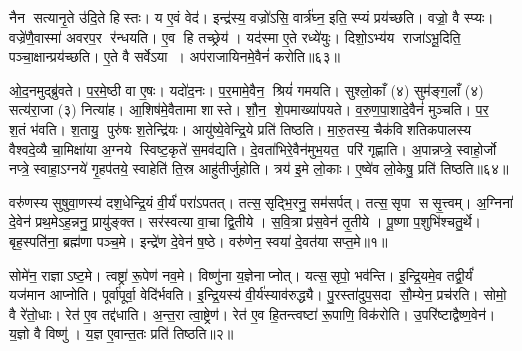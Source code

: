 नैन सत्यानृ॒ते उ॑दि॒ते हिस्तः।
य ए॒वं वेद॑।
इन्द्र॑स्य॒ वज्रो॑ऽसि॒ वार्त्र॑घ्न॒ इति॒ स्प्यं प्रय॑च्छति।
वज्रो॒ वै स्प्यः।
वज्रे॑णै॒वास्मा॑ अवरप॒र र॑न्धयति।
ए॒व हि तच्छ्रेय॑।
यद॑स्मा ए॒ते रध्ये॑युः।
दिशो॒ऽभ्य॑य राजा॑ऽभू॒दिति॒ पञ्चा॒क्षान्प्रय॑च्छति।
ए॒ते वै सर्वेऽया।
अप॑राजायिनमे॒वैनं॑ करोति॥६३॥

ओ॒द॒नमुद्ब्रु॑वते।
प॒र॒मे॒ष्ठी वा ए॒षः।
यदो॑द॒नः।
प॒र॒मामे॒वैन॒ श्रियं॑ गमयति।
सुश्लो॒काँ (४) सुम॑ङ्ग॒लाँ (४) सत्य॑रा॒जा (३) नित्या॑ह।
आ॒शिष॑मे॒वैतामा शास्ते।
शौ॒न॒ शे॒पमाख्या॑पयते।
व॒रु॒ण॒पा॒शादे॒वैनं॑ मुञ्चति।
प॒र॒ श॒तं भ॑वति।
श॒तायु॒ पुरु॑षः श॒तेन्द्रि॑यः।
आयु॑ष्ये॒वेन्द्रि॒ये प्रति॑ तिष्ठति।
मा॒रु॒तस्य॒ चैक॑विशतिकपालस्य वैश्वदे॒व्यै चा॒मिक्षा॑या अ॒ग्नये स्विष्ट॒कृते॑ स॒मव॑द्यति।
दे॒वता॑भिरे॒वैन॑मुभ॒यत॒ परि॑ गृह्णाति।
अ॒पान्नप्त्रे॒ स्वाहो॒र्जो नप्त्रे॒ स्वाहा॒ऽग्नये॑ गृ॒हप॑तये॒ स्वाहेति॑ ति॒स्र आहु॑तीर्जुहोति।
त्रय॑ इ॒मे लो॒काः।
ए॒ष्वे॑व लो॒केषु॒ प्रति॑ तिष्ठति॥६४॥\anuvakamend[दे॒वैरित्या॑ह स॒त्यस॑वं करोति त्रि॒ष्टुभ॑मे॒वैतेना॑भि॒ व्याह॑रति सत्यानृ॒ते ए॒वाव॑रुन्धे करोति श॒तेन्द्रि॑य॒ष्षट् च॑]




\clearpage
{}
\setcounter{anuvakam}{0}

वरु॑णस्य सुषुवा॒णस्य॑ दश॒धेन्द्रि॒यं वी॒र्यं॑ परा॑ऽपतत्।
तत्स॒सृद्भि॒रनु॒ सम॑सर्पत्।
तत्स॒सृपा ससृ॒त्त्वम्।
अ॒ग्निना॑ दे॒वेन॑ प्रथ॒मेऽह॒न्ननु॒ प्रायु॑ङ्क्त।
सर॑स्वत्या वा॒चा द्वि॒तीये।
स॒वि॒त्रा प्र॑स॒वेन॑ तृ॒तीये।
पू॒ष्णा प॒शुभि॑श्चतु॒र्थे।
बृह॒स्पति॑ना॒ ब्रह्म॑णा पञ्च॒मे।
इन्द्रे॑ण दे॒वेन॑ ष॒ष्ठे।
वरु॑णेन॒ स्वया॑ दे॒वत॑या सप्त॒मे॥१॥

सोमे॑न॒ राज्ञाऽष्ट॒मे।
त्वष्ट्रा॑ रू॒पेण॑ नव॒मे।
विष्णु॑ना य॒ज्ञेनाप्नोत्।
यत्स॒सृपो॒ भव॑न्ति।
इ॒न्द्रि॒यमे॒व तद्वी॒र्यं॑ यज॑मान आप्नोति।
पूर्वा॑पूर्वा॒ वेदि॑र्भवति।
इ॒न्द्रि॒यस्य॑ वी॒र्य॑स्याव॑रुद्ध्यै।
पु॒रस्ता॑दुप॒सदा सौ॒म्येन॒ प्रच॑रति।
सोमो॒ वै रे॑तो॒धाः।
रेत॑ ए॒व तद्द॑धाति।
अ॒न्त॒रा त्वा॒ष्ट्रेण॑।
रेत॑ ए॒व हि॒तन्त्वष्टा॑ रू॒पाणि॒ विक॑रोति।
उ॒परि॑ष्टाद्वैष्ण॒वेन॑।
य॒ज्ञो वै विष्णु॑।
य॒ज्ञ ए॒वान्त॒तः प्रति॑ तिष्ठति॥२॥\anuvakamend[स॒प्त॒मे द॑धाति॒ पञ्च॑ च]

